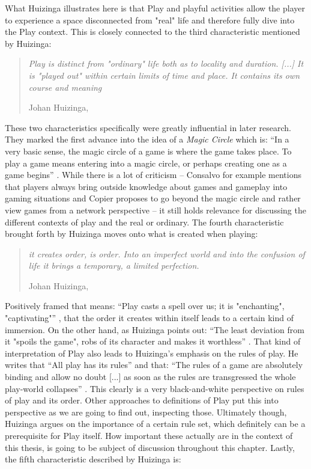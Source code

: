 What Huizinga illustrates here is that Play and playful activities allow the player to experience a space disconnected from "real" life and therefore fully dive into the Play context. This is closely connected to the third characteristic mentioned by Huizinga:

\begin{quote}
  \textit{Play is distinct from "ordinary" life both as to locality and duration. [...] It is "played out" within certain limits of time and place. It contains its own course and meaning}

  \footnotesize{Johan Huizinga, \cite[p. 9]{huizinga2020homo}}
\end{quote}

These two characteristics specifically were greatly influential in later research. They marked the first advance into the idea of a \textit{Magic Circle} which is: \enquote{In a very basic sense, the magic circle of a game is where the game takes place. To play a game means entering into a magic circle, or perhaps creating one as a game begins} \cite[p. 95]{salen2004rules}. While there is a lot of criticism -- Consalvo for example mentions that players always bring outside knowledge about games and gameplay into gaming situations \cite[p. 415]{consalvo2009there} and Copier proposes to go beyond the magic circle and rather view games from a network perspective \cite[p. 11]{copier2007beyond} -- it still holds relevance for discussing the different contexts of play and the real or ordinary. The fourth characteristic brought forth by Huizinga moves onto what is created when playing:

\begin{quote}
  \textit{it creates order, is order. Into an imperfect world and into the confusion of life it brings a temporary, a limited perfection.}

  \footnotesize{Johan Huizinga, \cite[p. 10]{huizinga2020homo}}
\end{quote}

Positively framed that means: \enquote{Play casts a spell over us; it is "enchanting", "captivating"} \cite[p. 10]{huizinga2020homo}, that the order it creates within itself leads to a certain kind of immersion. On the other hand, as Huizinga points out: \enquote{The least deviation from it "spoils the game", robs of its character and makes it worthless} \cite[p. 10]{huizinga2020homo}. That kind of interpretation of Play also leads to Huizinga's emphasis on the rules of play. He writes that \enquote{All play has its rules} and that: \enquote{The rules of a game are absolutely binding and allow no doubt [...] as soon as the rules are transgressed the whole play-world collapses} \cite[p. 11]{huizinga2020homo}. This clearly is a very black-and-white perspective on rules of play and its order. Other approaches to definitions of Play put this into perspective as we are going to find out, inspecting those. Ultimately though, Huizinga argues on the importance of a certain rule set, which definitely can be a prerequisite for Play itself. How important these actually are in the context of this thesis, is going to be subject of discussion throughout this chapter. Lastly, the fifth characteristic described by Huizinga is:

